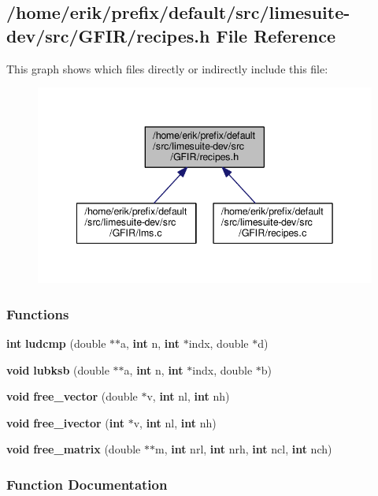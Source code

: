 \subsection{/home/erik/prefix/default/src/limesuite-\/dev/src/\+G\+F\+I\+R/recipes.h File Reference}
\label{recipes_8h}
This graph shows which files directly or indirectly include this file\+:
\nopagebreak
\begin{figure}[H]
\begin{center}
\leavevmode
\includegraphics[width=342pt]{d0/d09/recipes_8h__dep__incl}
\end{center}
\end{figure}
\subsubsection*{Functions}
\begin{DoxyCompactItemize}
\item 
{\bf int} {\bf ludcmp} (double $\ast$$\ast$a, {\bf int} n, {\bf int} $\ast$indx, double $\ast$d)
\item 
{\bf void} {\bf lubksb} (double $\ast$$\ast$a, {\bf int} n, {\bf int} $\ast$indx, double $\ast$b)
\item 
{\bf void} {\bf free\+\_\+vector} (double $\ast$v, {\bf int} nl, {\bf int} nh)
\item 
{\bf void} {\bf free\+\_\+ivector} ({\bf int} $\ast$v, {\bf int} nl, {\bf int} nh)
\item 
{\bf void} {\bf free\+\_\+matrix} (double $\ast$$\ast$m, {\bf int} nrl, {\bf int} nrh, {\bf int} ncl, {\bf int} nch)
\end{DoxyCompactItemize}


\subsubsection{Function Documentation}
